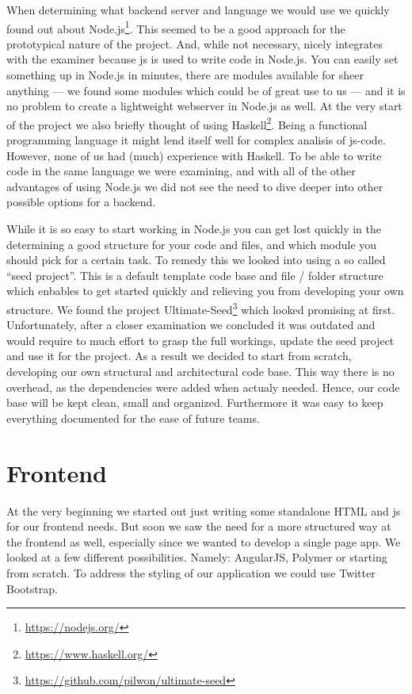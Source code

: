 When determining what backend server and language we would use
we quickly found out about
Node.js\footnote{\url{https://nodejs.org/}}.
This seemed to be a good approach for the prototypical nature of the project.
And, while not necessary, nicely integrates with the \gls{examiner}
because \gls{js} is used to write code in Node.js.
You can easily set something up in Node.js in minutes,
there are modules available for sheer anything
--- we found some modules which could be of great use to us ---
and it is no problem to create a lightweight webserver in Node.js as well.
At the very start of the project we also briefly thought of using
Haskell\footnote{\url{https://www.haskell.org/}}.
Being a functional programming language
it might lend itself well for complex analisis of \gls{js-code}.
However, none of us had (much) experience with Haskell.
To be able to write code in the same language we were examining,
and with all of the other advantages of using Node.js
we did not see the need
to dive deeper into other possible options for a backend.

While it is so easy to start working in Node.js
you can get lost quickly in the determining a good structure
for your code and files,
and which module you should pick for a certain task.
To remedy this we looked into using a so called ``seed project''.
This is a default template code base and file / folder structure which enbables
to get started quickly and relieving you from developing your own structure.
We found the project
Ultimate-Seed\footnote{\url{https://github.com/pilwon/ultimate-seed}}
which looked promising at first.
Unfortunately, after a closer examination we concluded it was outdated
and would require to much effort to grasp the full workings,
update the seed project and use it for the \gls{project}.
As a result we decided to start from scratch,
developing our own structural and architectural code base.
This way there is no overhead, as the dependencies were added when actualy 
needed. Hence, our code base will be kept clean, small and organized.
Furthermore it was easy to keep everything documented for the ease of future 
teams.

\section{Frontend}
At the very beginning we started out
just writing some standalone HTML and \gls{js} for our frontend needs.
But soon we saw the need for a more structured way at the frontend as well,
especially since we wanted to develop a single page app.
We looked at a few different possibilities.
Namely: AngularJS, Polymer or starting from scratch.
To address the styling of our application we could use Twitter Bootstrap.

